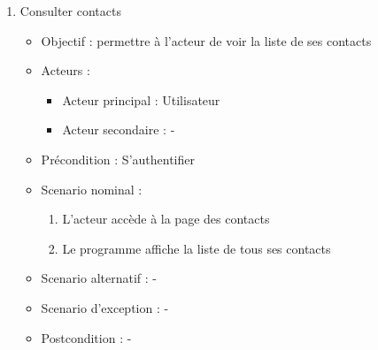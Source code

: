 \begin{enumerate}[label=\alph*.]
	\item Consulter contacts
	\begin{itemize}
		\item Objectif : permettre à l’acteur de voir la liste de ses contacts
		\item Acteurs :
		\begin{itemize}
			\item Acteur principal : Utilisateur
			\item Acteur secondaire : -
		\end{itemize}
		\item Précondition : S’authentifier
		\item Scenario nominal :
		\begin{enumerate}[label=\arabic*.]
			\item L’acteur accède à la page des contacts
			\item Le programme affiche la liste de tous ses contacts
		\end{enumerate}
		\item Scenario alternatif : -
	
		\item Scenario d’exception :  -
		\item Postcondition : -
	\end{itemize}
	

\end{enumerate}
